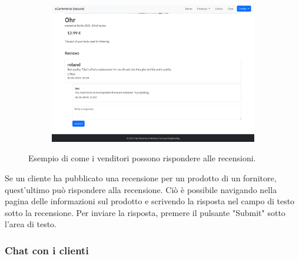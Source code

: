\documentclass[conference,onecolumn,a4paper]{IEEEtran}
\begin{document}
\begin{figure}[H]
    \centering
    \begin{subfigure}[b]{0.4\linewidth}
        \includegraphics[width=\linewidth]{resources/response.png}
    \end{subfigure}
    \caption{Esempio di come i venditori possono rispondere alle recensioni.}
\end{figure}

Se un cliente ha pubblicato una recensione per un prodotto di un fornitore, quest'ultimo può rispondere alla recensione. Ciò è possibile navigando nella pagina delle informazioni sul prodotto e scrivendo la risposta nel campo di testo sotto la recensione. Per inviare la risposta, premere il pulsante "Submit" sotto l'area di testo.

\subsubsection{Chat con i clienti}
\end{document}

